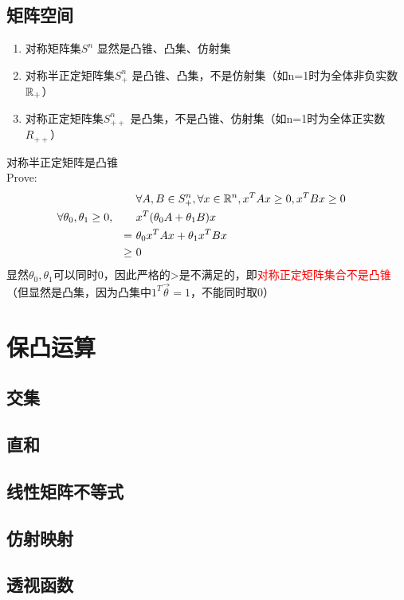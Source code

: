 \documentclass{mytemplate}
\begin{document}
\subsection{矩阵空间}
\begin{proposition}
    \hspace*{1em}
    \begin{enumerate}
        \item 对称矩阵集$S^n$ \qquad\qquad\quad 显然是凸锥、凸集、仿射集
        \item 对称半正定矩阵集$S_+^n$ \qquad 是凸锥、凸集，不是仿射集（如n=1时为全体非负实数$\mathbb{R}_+$）
        \item 对称正定矩阵集$S_{++}^n$ \qquad 是凸集，不是凸锥、仿射集（如n=1时为全体正实数$R_{++}$）
    \end{enumerate}
\end{proposition}
对称半正定矩阵是凸锥\\
Prove:
\begin{align}
     &                                   &        & \forall A,B \in S_+^n, \forall  x\in \mathbb{R}^n, x^T A x \geq 0, x^T B x \geq 0 &  & \\
     & \forall \theta_0,\theta_1 \geq 0, &        & x^T(\theta_0 A+\theta_1B)x                                                &  & \\
     &                                   & =\     & \theta_0x^T A x+\theta_1x^T B x                                           &  & \\
     &                                   & \geq\  & 0                                                                         &  &
\end{align}
显然$\theta_0, \theta_1$可以同时0，因此严格的>是不满足的，即\textcolor{red}{对称正定矩阵集合不是凸锥}\\
（但显然是凸集，因为凸集中$1^T\vec{\theta} = 1$，不能同时取0）


\section{保凸运算}



\subsection{交集}



\subsection{直和}



\subsection{线性矩阵不等式}



\subsection{仿射映射}



\subsection{透视函数}
\end{document}
